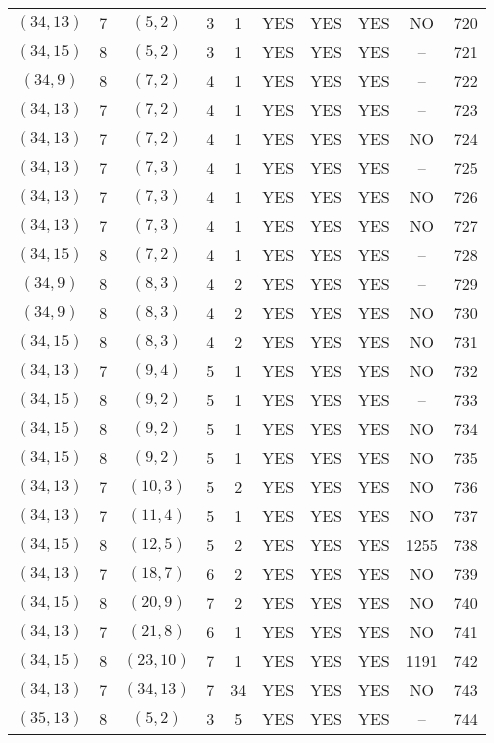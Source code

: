 \begin{longtable}{|c|c|c|c|c|c|c|c|c|c|}
$(34, 13)$ & 7 & $(5, 2)$ & 3 & 1 & YES & YES & YES & NO & 720\\
$(34, 15)$ & 8 & $(5, 2)$ & 3 & 1 & YES & YES & YES & -- & 721\\
$(34, 9)$ & 8 & $(7, 2)$ & 4 & 1 & YES & YES & YES & -- & 722\\
$(34, 13)$ & 7 & $(7, 2)$ & 4 & 1 & YES & YES & YES & -- & 723\\
$(34, 13)$ & 7 & $(7, 2)$ & 4 & 1 & YES & YES & YES & NO & 724\\
$(34, 13)$ & 7 & $(7, 3)$ & 4 & 1 & YES & YES & YES & -- & 725\\
$(34, 13)$ & 7 & $(7, 3)$ & 4 & 1 & YES & YES & YES & NO & 726\\
$(34, 13)$ & 7 & $(7, 3)$ & 4 & 1 & YES & YES & YES & NO & 727\\
$(34, 15)$ & 8 & $(7, 2)$ & 4 & 1 & YES & YES & YES & -- & 728\\
$(34, 9)$ & 8 & $(8, 3)$ & 4 & 2 & YES & YES & YES & -- & 729\\
$(34, 9)$ & 8 & $(8, 3)$ & 4 & 2 & YES & YES & YES & NO & 730\\
$(34, 15)$ & 8 & $(8, 3)$ & 4 & 2 & YES & YES & YES & NO & 731\\
$(34, 13)$ & 7 & $(9, 4)$ & 5 & 1 & YES & YES & YES & NO & 732\\
$(34, 15)$ & 8 & $(9, 2)$ & 5 & 1 & YES & YES & YES & -- & 733\\
$(34, 15)$ & 8 & $(9, 2)$ & 5 & 1 & YES & YES & YES & NO & 734\\
$(34, 15)$ & 8 & $(9, 2)$ & 5 & 1 & YES & YES & YES & NO & 735\\
$(34, 13)$ & 7 & $(10, 3)$ & 5 & 2 & YES & YES & YES & NO & 736\\
$(34, 13)$ & 7 & $(11, 4)$ & 5 & 1 & YES & YES & YES & NO & 737\\
$(34, 15)$ & 8 & $(12, 5)$ & 5 & 2 & YES & YES & YES & 1255 & 738\\
$(34, 13)$ & 7 & $(18, 7)$ & 6 & 2 & YES & YES & YES & NO & 739\\
$(34, 15)$ & 8 & $(20, 9)$ & 7 & 2 & YES & YES & YES & NO & 740\\
$(34, 13)$ & 7 & $(21, 8)$ & 6 & 1 & YES & YES & YES & NO & 741\\
$(34, 15)$ & 8 & $(23, 10)$ & 7 & 1 & YES & YES & YES & 1191 & 742\\
$(34, 13)$ & 7 & $(34, 13)$ & 7 & 34 & YES & YES & YES & NO & 743\\
$(35, 13)$ & 8 & $(5, 2)$ & 3 & 5 & YES & YES & YES & -- & 744\\

\end{longtable}
